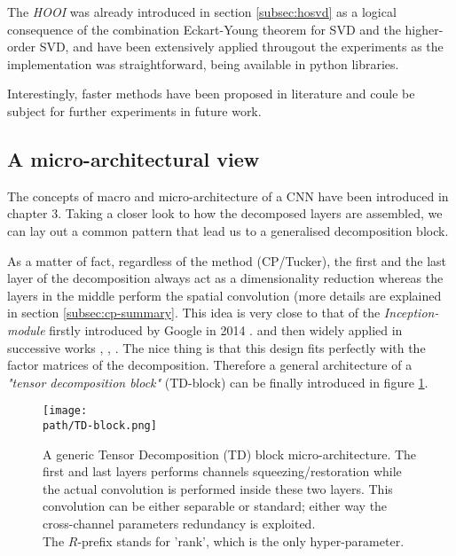 The \emph{HOOI} was already introduced in section \ref{subsec:hosvd} as a logical consequence of the combination Eckart-Young theorem for SVD and the higher-order SVD, and have been extensively applied througout the experiments as the implementation was straightforward, being available in python libraries. 
\newline 

Interestingly, faster methods have been proposed in literature \parencite{tucker-fast1} \parencite{tucker-fast2} and coule be subject for further experiments in future work.

\newpage 
\subsection{A micro-architectural view}
The concepts of macro and micro-architecture of a CNN have been introduced in chapter 3. Taking a closer look to how the decomposed layers are assembled, we can lay out a common pattern that lead us to a generalised decomposition block. 
\newline 

As a matter of fact, regardless of the method (CP/Tucker), the first and the last layer of the decomposition always act as a dimensionality reduction whereas the layers in the middle perform the spatial convolution (more details are explained in section \ref{subsec:cp-summary}. This idea is very close to that of the \emph{Inception-module} firstly introduced by Google in 2014 \parencite{googlenet}. and then widely applied in successive works \parencite{squeezenet}, \parencite{chollet}, \parencite{mobilenets}.  
\newline
The nice thing is that this design fits perfectly with the factor matrices of the decomposition.  
Therefore a general architecture of a \emph{"tensor decomposition block"} (TD-block) can be finally introduced in figure \ref{fig:TD-block}.

\begin{figure}[h!]
 \centering
 \texttt{[image: \\path/TD-block.png]} 
 \caption[Generic tensor decomposition (TD) block.]{A generic Tensor Decomposition (TD) block micro-architecture. The first and last layers performs channels squeezing/restoration while the actual convolution is performed inside these two layers. This convolution can be either separable or standard; either way the cross-channel parameters redundancy is exploited.\\ The $R$-prefix stands for 'rank', which is the only hyper-parameter.}
 \label{fig:TD-block}
\end{figure}

